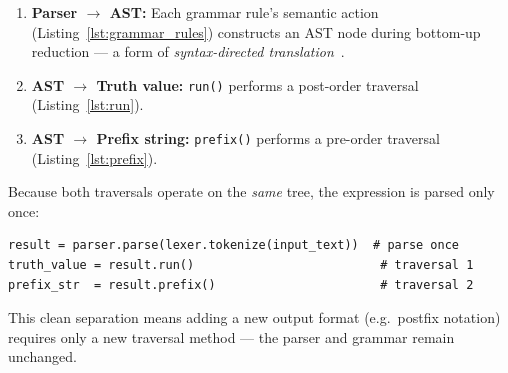 \begin{enumerate}
    \item \textbf{Parser $\rightarrow$ AST:} Each grammar rule's semantic action (Listing~\ref{lst:grammar_rules}) constructs an AST node during bottom-up reduction --- a form of \emph{syntax-directed translation}~\citep{aho2006compilers}.
    \item \textbf{AST $\rightarrow$ Truth value:} \texttt{run()} performs a post-order traversal (Listing~\ref{lst:run}).
    \item \textbf{AST $\rightarrow$ Prefix string:} \texttt{prefix()} performs a pre-order traversal (Listing~\ref{lst:prefix}).
\end{enumerate}

Because both traversals operate on the \emph{same} tree, the expression is parsed only once:

\begin{lstlisting}[caption={Pipeline integration in \texttt{MainWindow.evaluate()}}, label={lst:integration}]
result = parser.parse(lexer.tokenize(input_text))  # parse once
truth_value = result.run()                          # traversal 1
prefix_str  = result.prefix()                       # traversal 2
\end{lstlisting}

This clean separation means adding a new output format (e.g.\ postfix notation) requires only a new traversal method --- the parser and grammar remain unchanged.
